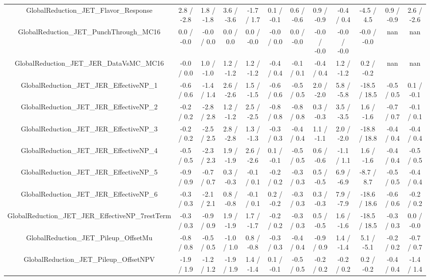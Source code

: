 \begin{table}[htbp]
\begin{center}
\begin{tabular}{|c|c|c|c|c|c|c|c|c|c|c|c|}
  GlobalReduction_JET_Flavor_Response & 2.8 / -2.8 & 1.8 / -1.8 & 3.6 / -3.6 & -1.7 / 1.7 & 0.1 / -0.1 & 0.6 / -0.6 & 0.9 / -0.9 & -0.4 / 0.4 & -4.5 / 4.5 & 0.9 / -0.9 & 2.6 / -2.6 \\ 
  GlobalReduction_JET_PunchThrough_MC16 & 0.0 / -0.0 & -0.0 / 0.0 & 0.0 / 0.0 & 0.0 / -0.0 & -0.0 / 0.0 & 0.0 / -0.0 & -0.0 / -0.0 & -0.0 / -0.0 & -0.0 / -0.0 &    nan    &    nan    \\ 
  GlobalReduction_JET_JER_DataVsMC_MC16 & -0.0 / 0.0 & 1.0 / -1.0 & 1.2 / -1.2 & 1.2 / -1.2 & -0.4 / 0.4 & -0.1 / 0.1 & -0.4 / 0.4 & 1.2 / -1.2 & 0.2 / -0.2 &    nan    &    nan    \\ 
  GlobalReduction_JET_JER_EffectiveNP_1 & -0.6 / 0.6 & -1.4 / 1.4 & 2.6 / -2.6 & 1.5 / -1.5 & -0.6 / 0.6 & -0.5 / 0.5 & 2.0 / -2.0 & 5.8 / -5.8 & -18.5 / 18.5 & -0.5 / 0.5 & 0.1 / -0.1 \\ 
  GlobalReduction_JET_JER_EffectiveNP_2 & -0.2 / 0.2 & -2.8 / 2.8 & 1.2 / -1.2 & 2.5 / -2.5 & -0.8 / 0.8 & -0.8 / 0.8 & 0.3 / -0.3 & 3.5 / -3.5 & 1.6 / -1.6 & -0.7 / 0.7 & -0.1 / 0.1 \\ 
  GlobalReduction_JET_JER_EffectiveNP_3 & -0.2 / 0.2 & -2.5 / 2.5 & 2.8 / -2.8 & 1.3 / -1.3 & -0.3 / 0.3 & -0.4 / 0.4 & 1.1 / -1.1 & 2.0 / -2.0 & -18.8 / 18.8 & -0.4 / 0.4 & -0.4 / 0.4 \\ 
  GlobalReduction_JET_JER_EffectiveNP_4 & -0.5 / 0.5 & -2.3 / 2.3 & 1.9 / -1.9 & 2.6 / -2.6 & 0.1 / -0.1 & -0.5 / 0.5 & 0.6 / -0.6 & -1.1 / 1.1 & 1.6 / -1.6 & -0.4 / 0.4 & -0.5 / 0.5 \\ 
  GlobalReduction_JET_JER_EffectiveNP_5 & -0.9 / 0.9 & -0.7 / 0.7 & 0.3 / -0.3 & -0.1 / 0.1 & -0.2 / 0.2 & -0.3 / 0.3 & 0.5 / -0.5 & 6.9 / -6.9 & -8.7 / 8.7 & -0.5 / 0.5 & -0.4 / 0.4 \\ 
  GlobalReduction_JET_JER_EffectiveNP_6 & -0.3 / 0.3 & -2.1 / 2.1 & 0.8 / -0.8 & -0.1 / 0.1 & 0.2 / -0.2 & -0.3 / 0.3 & 0.3 / -0.3 & 7.9 / -7.9 & -18.6 / 18.6 & -0.6 / 0.6 & -0.2 / 0.2 \\ 
  GlobalReduction_JET_JER_EffectiveNP_7restTerm & -0.3 / 0.3 & -0.9 / 0.9 & 1.9 / -1.9 & 1.7 / -1.7 & -0.2 / 0.2 & -0.3 / 0.3 & 0.5 / -0.5 & 1.6 / -1.6 & -18.5 / 18.5 & -0.3 / 0.3 & 0.0 / -0.0 \\ 
  GlobalReduction_JET_Pileup_OffsetMu & -0.8 / 0.8 & -0.5 / 0.5 & -1.0 / 1.0 & 0.8 / -0.8 & -0.3 / 0.3 & -0.4 / 0.4 & -0.9 / 0.9 & 1.4 / -1.4 & 5.1 / -5.1 & -0.2 / 0.2 & -0.7 / 0.7 \\ 
  GlobalReduction_JET_Pileup_OffsetNPV & -1.9 / 1.9 & -1.2 / 1.2 & -1.9 / 1.9 & 1.4 / -1.4 & 0.1 / -0.1 & -0.5 / 0.5 & -0.2 / 0.2 & -0.2 / 0.2 & 0.2 / -0.2 & -0.4 / 0.4 & -1.4 / 1.4 \\ 

\end{tabular}
\end{center}
\end{table}
